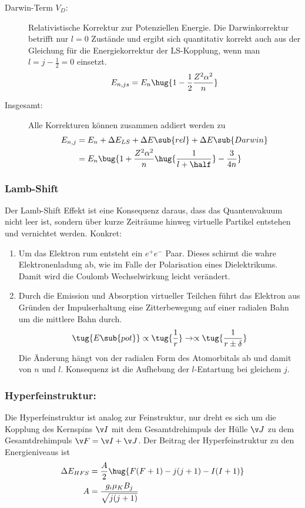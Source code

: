 \documentclass[twocolumn]{summery_4.1}
\begin{document}
\begin{description}
    \item[Darwin-Term \(V_D\):] Relativistische Korrektur zur Potenziellen Energie. Die Darwinkorrektur betrifft nur \(l=0\) Zustände und ergibt sich quantitativ korrekt auch aus der Gleichung für die Energiekorrektur der LS-Kopplung, wenn man \(l=j-\frac12 =0\) einsetzt.
    \begin{align*}
        E_{n,js} = E_n\hug{1 - \frac{1}{2}\frac{Z^2\alpha^2}{n}}
    \end{align*}

    \item[Insgesamt:] Alle Korrekturen können zusammen addiert werden zu 
    \begin{align*}
        E_{n,j} &= E_n + \Delta E_{LS} + \Delta E\sub{rel} + \Delta E\sub{Darwin}\\ 
        &= E_n \bug{1 + \frac{Z^2 \alpha^2}{n} \hug{\frac{1}{l + \half}}- \frac{3}{4n}}
    \end{align*}
\end{description}

\subsubsection{Lamb-Shift}
Der Lamb-Shift Effekt ist eine Konsequenz daraus, dass das Quantenvakuum nicht leer ist, sondern über kurze Zeiträume hinweg virtuelle Partikel entstehen und vernichtet werden. 
Konkret:
\begin{enumerate}
    \item Um das Elektron rum entsteht ein \(e^+ e^-\) Paar. Dieses schirmt die wahre Elektronenladung ab, wie im Falle der Polarisation eines Dielektrikums. Damit wird die Coulomb Wechselwirkung leicht verändert.
    \item Durch die Emission und Absorption virtueller Teilchen führt das Elektron aus Gründen der Impulserhaltung eine Zitterbewegung auf einer radialen Bahn um die mittlere Bahn durch. 
    \begin{align*}
        \tug{E\sub{pot}} \propto \tug{\frac1{r}} \to \propto \tug{\frac{1}{r\pm\delta}}
    \end{align*}
    Die Änderung hängt von der radialen Form des Atomorbitals ab und damit von $n$ und $l$. Konsequenz ist die Aufhebung der \(l\)-Entartung bei gleichem \(j\). 
\end{enumerate}

\subsubsection{Hyperfeinstruktur:}
Die Hyperfeinstruktur ist analog zur Feinstruktur, nur dreht es sich um die Kopplung des Kernspins \(\v I\) mit dem Gesamtdrehimpuls der Hülle \(\v J\) zu dem Gesamtdrehimpuls \(\v F = \v I + \v J \).
Der Beitrag der Hyperfeinstruktur zu den Energieniveaus ist 
\begin{align*}
    \Delta E_{HFS} &= \frac A2 \hug{F(F+1) - j(j+1) - I(I+1)} \\
    A&=\frac{g_i \mu_K B_j}{\sqrt{j(j+1)}}
\end{align*}
\end{document}
